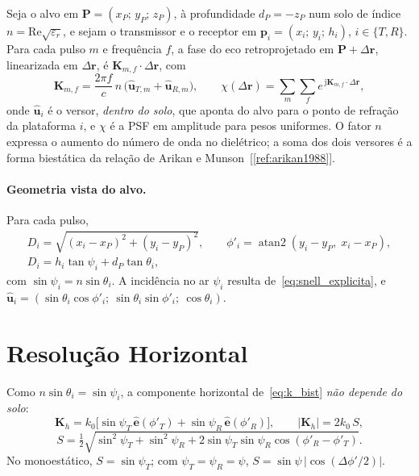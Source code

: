 \documentclass[12pt,a4paper,oneside]{book}
\theoremstyle{remark}
\DeclareMathOperator{\atantwo}{atan2}
\newcommand{\vect}[1]{\boldsymbol{#1}}
\newcommand{\jj}{\mathrm{j}}
\newcommand{\citar}[1]{[\ref{ref:#1}]}
\theoremstyle{plain}
\theoremstyle{definition}
\begin{document}
Seja o alvo em $\vect P=(x_P;\,y_P;\,z_P)$, à profundidade $d_P=-z_P$ num solo de
índice $n=\mathrm{Re}\sqrt{\varepsilon_r}$, e sejam o transmissor e o receptor
em $\vect p_i=(x_i;\,y_i;\,h_i)$, $i\in\{T,R\}$. Para cada pulso $m$ e frequência
$f$, a fase do eco retroprojetado em $\vect P+\Delta\vect r$, linearizada em
$\Delta\vect r$, é $\vect K_{m,f}\cdot\Delta\vect r$, com
\begin{equation}
  \vect K_{m,f}=\frac{2\pi f}{c}\,n\,\big(\hat{\vect u}_{T,m}+\hat{\vect u}_{R,m}\big),
  \qquad
  \chi(\Delta\vect r)=\sum_{m}\sum_{f} e^{\,\jj\vect K_{m,f}\cdot\Delta\vect r},
  \label{eq:k_bist}
\end{equation}
onde $\hat{\vect u}_i$ é o versor, \emph{dentro do solo}, que aponta do alvo
para o ponto de refração da plataforma $i$, e $\chi$ é a PSF em amplitude para
pesos uniformes. O fator $n$ expressa o aumento do número de onda no
dielétrico; a soma dos dois versores é a forma biestática da relação de
Arikan e Munson~\citar{arikan1988}.

\paragraph{Geometria vista do alvo.} Para cada pulso,
\begin{equation}
  \begin{gathered}
  D_i=\sqrt{(x_i-x_P)^2+(y_i-y_P)^2},\qquad
  \phi'_i=\atantwo(y_i-y_P,\;x_i-x_P),\\
  D_i=h_i\tan\psi_i+d_P\tan\theta_i,
  \end{gathered}
  \label{eq:geo_alvo}
\end{equation}
com $\sin\psi_i=n\sin\theta_i$. A incidência no ar $\psi_i$ resulta
de~\eqref{eq:snell_explicita}, e
$\hat{\vect u}_i=(\sin\theta_i\cos\phi'_i;\ \sin\theta_i\sin\phi'_i;\ \cos\theta_i)$.

\section{Resolução Horizontal}
\label{sec:delta_xy}

Como $n\sin\theta_i=\sin\psi_i$, a componente horizontal
de~\eqref{eq:k_bist} \emph{não depende do solo}:
\begin{equation}
  \vect K_h=k_0\big[\sin\psi_T\,\hat{\vect e}(\phi'_T)+\sin\psi_R\,\hat{\vect e}(\phi'_R)\big],
  \qquad
  |\vect K_h|=2k_0\,S,
\end{equation}
\begin{equation}
  \boxed{S=\tfrac12\sqrt{\sin^2\psi_T+\sin^2\psi_R+2\sin\psi_T\sin\psi_R\cos(\phi'_R-\phi'_T)}}.
  \label{eq:S}
\end{equation}
No monoestático, $S=\sin\psi_T$; com $\psi_T=\psi_R=\psi$, $S=\sin\psi\,|\cos(\Delta\phi'/2)|$.
\end{document}
